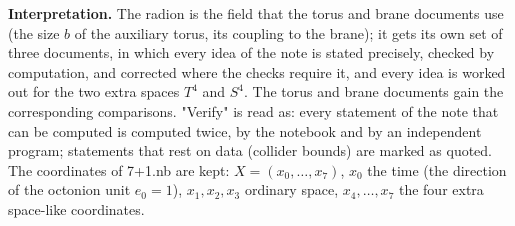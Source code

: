 \documentclass[10pt,a4paper]{article}
\begin{document}
\textbf{Interpretation.} The radion is the field that the torus and brane documents use (the size $b$ of the auxiliary torus, its coupling to the brane); it gets its own set of three documents, in which every idea of the note is stated precisely, checked by computation, and corrected where the checks require it, and every idea is worked out for the two extra spaces $T^4$ and $S^4$. The torus and brane documents gain the corresponding comparisons. "Verify" is read as: every statement of the note that can be computed is computed twice, by the notebook and by an independent program; statements that rest on data (collider bounds) are marked as quoted. The coordinates of 7+1.nb are kept: $X=(x_0,\dots,x_7)$, $x_0$ the time (the direction of the octonion unit $e_0=1$), $x_1,x_2,x_3$ ordinary space, $x_4,\dots,x_7$ the four extra space-like coordinates.
\end{document}
